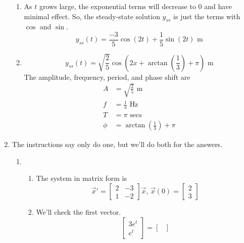 \begin{enumerate}[label=\arabic*.]
\begin{enumerate}[label=(\alph*)]
				\item
					As $t$ grows large, the exponential terms will decrease to 0 and have minimal effect. So, the steady-state solution $y_{ss}$ is just the terms with $\cos$ and $\sin$.
					\begin{equation*}
						y_{ss}(t) = \frac{-3}{5}\cos{(2t)} + \frac{1}{5}\sin{(2t)} \text{ m}
					\end{equation*}
				\item
					\begin{equation*}
						y_{ss}(t) = \sqrt{\frac{2}{5}}\cos{\left(2x + \arctan{\left(\frac{1}{3}\right)} + \pi\right)} \text{ m}
					\end{equation*}
					The amplitude, frequency, period, and phase shift are
					\begin{align*}
						A &= \sqrt{\frac{2}{5}} \text{ m} \\
						f &= \frac{1}{\pi} \text{ Hz} \\
						T &= \pi \text{ secs} \\
						\phi &= \arctan{\left(\frac{1}{3}\right)} + \pi
					\end{align*}
			\end{enumerate}
		\item
			The instructions say only do one, but we'll do both for the answers.
			\begin{enumerate}[label=(\alph*)]
				\item
					\begin{enumerate}[label=(\roman*)]
						\item
							The system in matrix form is
							\begin{equation*}
								\vec{x}' = \begin{bmatrix}
									2 & -3 \\
									1 & -2
								\end{bmatrix}\vec{x} \text{, } \vec{x}(0) = \begin{bmatrix}
									2 \\
									3
								\end{bmatrix}
							\end{equation*}
						\item
							We'll check the first vector.
							\begin{equation*}
								\begin{bmatrix}
									3e^t \\
									e^t
								\end{bmatrix} = \begin{bmatrix}

\end{bmatrix}
\end{equation*}
\end{enumerate}
\end{enumerate}
\end{enumerate}
